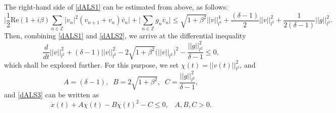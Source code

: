 \documentclass[preprintnumbers,amsmath,amssymb]{revtex4}
\begin{document}
The right-hand side of \eqref{dALS1} can be estimated  from above, as follows:
\begin{equation}
\label{dALS2}
\bigg|\frac{1}{2}\mathrm{Re}(1+i\beta)\sum_{n\in\mathbb{Z}}|v_n|^2(v_{n+1}+v_n)\overline{v}_n\bigg|+\bigg|\sum_{n\in\mathbb{Z}}g_n\overline{v}_n\bigg|\leq \sqrt{1+\beta^2}||v||^4_{l^4}+\frac{(\delta-1)}{2}||v||_{l^2}^2+\frac{1}{2(\delta-1)}||g||^2_{l^2}.
\end{equation}
Then, combining \eqref{dALS1} and \eqref{dALS2}, we arrive at the differential inequality
\begin{equation}
\label{dALS3}
\frac{d}{dt}||v||_{l^2}^2+(\delta-1)||v||^2_{l^2}-2\sqrt{1+\beta^2}\big(||v||_{l^2}\big)^2-\frac{||g||^2_{l^2}}{\delta-1}\leq 0,
\end{equation}
which shall be explored further. For this purpose, we set $\chi(t)=||v(t)||^2_{l^2}$, and
\begin{equation}
\label{dALS4}
A=(\delta-1),\;\;B=2\sqrt{1+\beta^2},\;\;C=\frac{||g||^2_{l^2}}{\delta-1},
\end{equation}
and \eqref{dALS3} can be written as 
\begin{equation}
\label{dALS5}
\dot{x}(t)+A\chi(t)-B\chi(t)^2-C\leq 0,\;\;\;A,B,C>0.
\end{equation}
\end{document}
